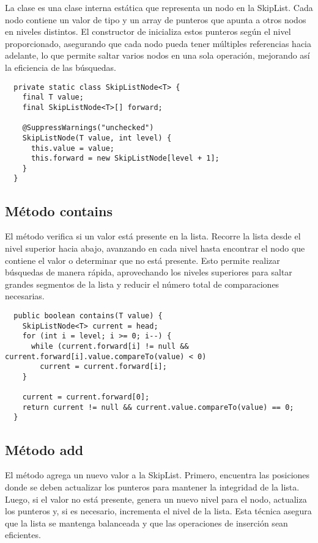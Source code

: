 La clase  es una clase interna estática que representa un nodo en la SkipList. Cada nodo contiene un valor de tipo  y un array de punteros  que apunta a otros nodos en niveles distintos. El constructor de  inicializa estos punteros según el nivel proporcionado, asegurando que cada nodo pueda tener múltiples referencias hacia adelante, lo que permite saltar varios nodos en una sola operación, mejorando así la eficiencia de las búsquedas.

\begin{verbatim}
  private static class SkipListNode<T> {
    final T value;
    final SkipListNode<T>[] forward;

    @SuppressWarnings("unchecked")
    SkipListNode(T value, int level) {
      this.value = value;
      this.forward = new SkipListNode[level + 1];
    }
  }
\end{verbatim}

\subsection{Método contains}

El método  verifica si un valor está presente en la lista. Recorre la lista desde el nivel superior hacia abajo, avanzando en cada nivel hasta encontrar el nodo que contiene el valor o determinar que no está presente. Esto permite realizar búsquedas de manera rápida, aprovechando los niveles superiores para saltar grandes segmentos de la lista y reducir el número total de comparaciones necesarias.

\begin{verbatim}
  public boolean contains(T value) {
    SkipListNode<T> current = head;
    for (int i = level; i >= 0; i--) {
      while (current.forward[i] != null && current.forward[i].value.compareTo(value) < 0)
        current = current.forward[i];
    }

    current = current.forward[0];
    return current != null && current.value.compareTo(value) == 0;
  }
\end{verbatim}

\subsection{Método add}

El método  agrega un nuevo valor a la SkipList. Primero, encuentra las posiciones donde se deben actualizar los punteros para mantener la integridad de la lista. Luego, si el valor no está presente, genera un nuevo nivel para el nodo, actualiza los punteros y, si es necesario, incrementa el nivel de la lista. Esta técnica asegura que la lista se mantenga balanceada y que las operaciones de inserción sean eficientes.

